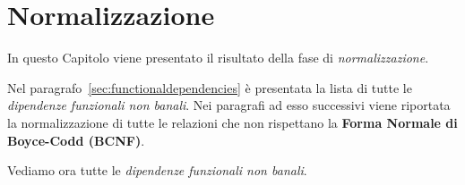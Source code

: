 \chapter{Normalizzazione}
In questo Capitolo viene presentato il risultato della fase di {\it normalizzazione}.

Nel paragrafo~\vref{sec:functionaldependencies} è presentata la lista di tutte le {\it dipendenze
funzionali non banali}. Nei paragrafi ad esso successivi viene riportata la normalizzazione
di tutte le relazioni che non rispettano la {\bf Forma Normale di Boyce-Codd (BCNF)}.

Vediamo ora tutte le {\it dipendenze funzionali non banali}.





